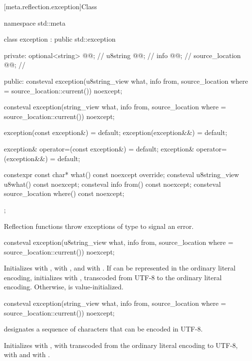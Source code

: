 [meta.reflection.exception]{Class }

%
\begin{codeblock}
namespace std::meta {
  class exception : public std::exception {
  private:
    optional<string> @@;     // \expos
    u8string @@;           // \expos
    info @@;                 // \expos
    source_location @@;     // \expos

  public:
    consteval exception(u8string_view what, info from,
                        source_location where = source_location::current()) noexcept;

    consteval exception(string_view what, info from,
                        source_location where = source_location::current()) noexcept;

    exception(const exception&) = default;
    exception(exception&&) = default;

    exception& operator=(const exception&) = default;
    exception& operator=(exception&&) = default;

    constexpr const char* what() const noexcept override;
    consteval u8string_view u8what() const noexcept;
    consteval info from() const noexcept;
    consteval source_location where() const noexcept;
  };
}
\end{codeblock}

\pnum
Reflection functions throw exceptions of type 
to signal an error.

%
\begin{itemdecl}
consteval exception(u8string_view what, info from,
                    source_location where = source_location::current()) noexcept;
\end{itemdecl}
\begin{itemdescr}
\pnum
\effects
Initializes
 with ,
 with , and
 with .
If  can be represented in the ordinary literal encoding,
initializes  with ,
transcoded from UTF-8 to the ordinary literal encoding.
Otherwise,  is value-initialized.
\end{itemdescr}

%
\begin{itemdecl}
consteval exception(string_view what, info from,
                    source_location where = source_location::current()) noexcept;
\end{itemdecl}
\begin{itemdescr}
\pnum
\constantwhen
{} designates a sequence of characters
that can be encoded in UTF-8.

\pnum
\effects
Initializes
 with ,
 with 
transcoded from the ordinary literal encoding to UTF-8,
 with  and
 with .
\end{itemdescr}

